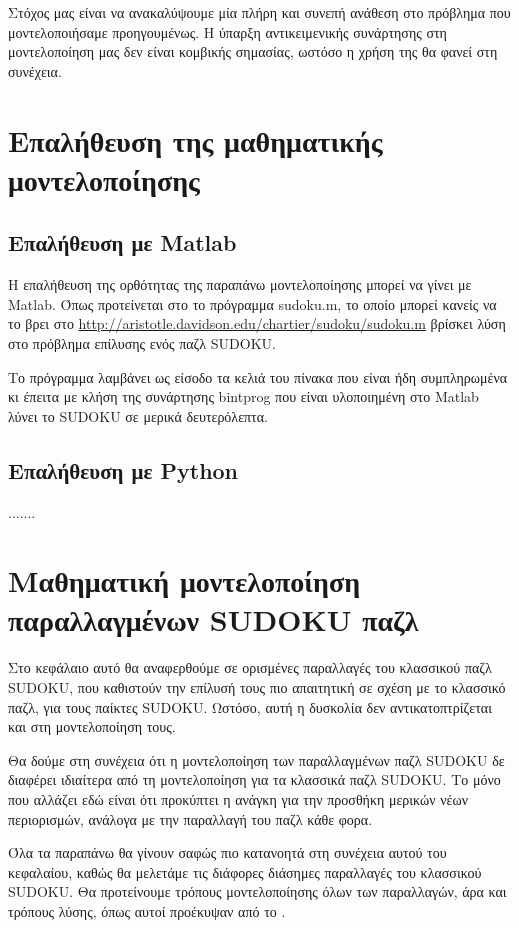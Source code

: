 \documentclass[12pt]{book}
\theoremstyle{definition}
\begin{document}
Στόχος μας είναι να ανακαλύψουμε μία πλήρη και συνεπή ανάθεση στο πρόβλημα που μοντελοποιήσαμε προηγουμένως. Η ύπαρξη αντικειμενικής συνάρτησης στη μοντελοποίηση μας δεν είναι κομβικής σημασίας, ωστόσο η χρήση της θα φανεί στη συνέχεια.

\section{Επαλήθευση της μαθηματικής μοντελοποίησης}

\subsection{Επαλήθευση με Matlab}

Η επαλήθευση της ορθότητας της παραπάνω μοντελοποίησης μπορεί να γίνει με Matlab. Όπως προτείνεται στο \cite{3} το πρόγραμμα sudoku.m, το οποίο μπορεί κανείς να το βρει στο \url{http://aristotle.davidson.edu/chartier/sudoku/sudoku.m} βρίσκει λύση στο πρόβλημα επίλυσης ενός παζλ SUDOKU. \par

Το πρόγραμμα λαμβάνει ως είσοδο τα κελιά του πίνακα που είναι ήδη συμπληρωμένα κι έπειτα με κλήση της συνάρτησης bintprog που είναι υλοποιημένη στο Matlab λύνει το SUDOKU σε μερικά δευτερόλεπτα.

\subsection{Επαλήθευση με Python}
.......

\section{Μαθηματική μοντελοποίηση παραλλαγμένων SUDOKU παζλ}

Στο κεφάλαιο αυτό θα αναφερθούμε σε ορισμένες παραλλαγές του κλασσικού παζλ SUDOKU, που καθιστούν την επίλυσή τους πιο απαιτητική σε σχέση με το κλασσικό παζλ, για τους παίκτες SUDOKU. Ωστόσο, αυτή η δυσκολία δεν αντικατοπτρίζεται και στη μοντελοποίηση τους. \par

Θα δούμε στη συνέχεια ότι η μοντελοποίηση των παραλλαγμένων παζλ SUDOKU δε διαφέρει ιδιαίτερα από τη μοντελοποίηση για τα κλασσικά παζλ SUDOKU. Το μόνο που αλλάζει εδώ είναι ότι προκύπτει η ανάγκη για την προσθήκη μερικών νέων περιορισμών, ανάλογα με την παραλλαγή του παζλ κάθε φορα. \par

Όλα τα παραπάνω θα γίνουν σαφώς πιο κατανοητά στη συνέχεια αυτού του κεφαλαίου, καθώς θα μελετάμε τις διάφορες διάσημες παραλλαγές του κλασσικού SUDOKU. Θα προτείνουμε τρόπους μοντελοποίησης όλων των παραλλαγών, άρα και τρόπους λύσης, όπως αυτοί προέκυψαν από το \cite{3}.
\end{document}
